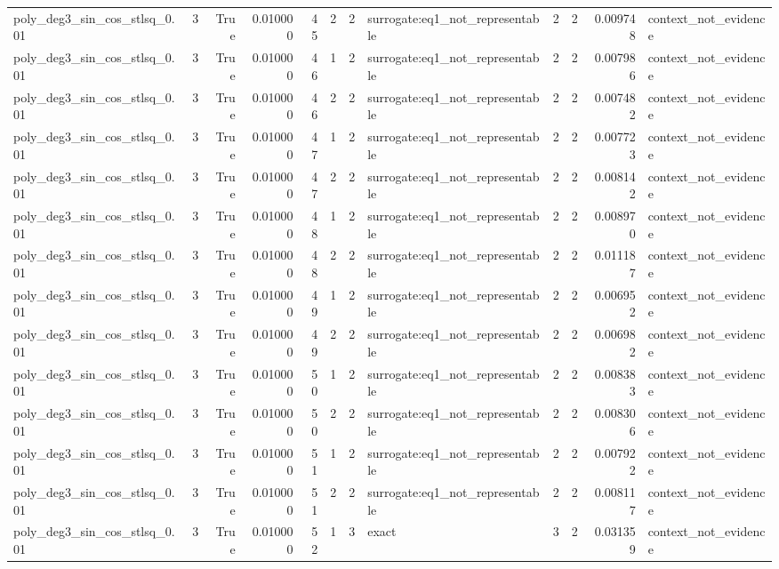 \begin{tabular}{lrrrrrrlrrrl}
poly\_deg3\_sin\_cos\_stlsq\_0.01 & 3 & True & 0.010000 & 45 & 2 & 2 & surrogate:eq1\_not\_representable & 2 & 2 & 0.009748 & context\_not\_evidence \\
poly\_deg3\_sin\_cos\_stlsq\_0.01 & 3 & True & 0.010000 & 46 & 1 & 2 & surrogate:eq1\_not\_representable & 2 & 2 & 0.007986 & context\_not\_evidence \\
poly\_deg3\_sin\_cos\_stlsq\_0.01 & 3 & True & 0.010000 & 46 & 2 & 2 & surrogate:eq1\_not\_representable & 2 & 2 & 0.007482 & context\_not\_evidence \\
poly\_deg3\_sin\_cos\_stlsq\_0.01 & 3 & True & 0.010000 & 47 & 1 & 2 & surrogate:eq1\_not\_representable & 2 & 2 & 0.007723 & context\_not\_evidence \\
poly\_deg3\_sin\_cos\_stlsq\_0.01 & 3 & True & 0.010000 & 47 & 2 & 2 & surrogate:eq1\_not\_representable & 2 & 2 & 0.008142 & context\_not\_evidence \\
poly\_deg3\_sin\_cos\_stlsq\_0.01 & 3 & True & 0.010000 & 48 & 1 & 2 & surrogate:eq1\_not\_representable & 2 & 2 & 0.008970 & context\_not\_evidence \\
poly\_deg3\_sin\_cos\_stlsq\_0.01 & 3 & True & 0.010000 & 48 & 2 & 2 & surrogate:eq1\_not\_representable & 2 & 2 & 0.011187 & context\_not\_evidence \\
poly\_deg3\_sin\_cos\_stlsq\_0.01 & 3 & True & 0.010000 & 49 & 1 & 2 & surrogate:eq1\_not\_representable & 2 & 2 & 0.006952 & context\_not\_evidence \\
poly\_deg3\_sin\_cos\_stlsq\_0.01 & 3 & True & 0.010000 & 49 & 2 & 2 & surrogate:eq1\_not\_representable & 2 & 2 & 0.006982 & context\_not\_evidence \\
poly\_deg3\_sin\_cos\_stlsq\_0.01 & 3 & True & 0.010000 & 50 & 1 & 2 & surrogate:eq1\_not\_representable & 2 & 2 & 0.008383 & context\_not\_evidence \\
poly\_deg3\_sin\_cos\_stlsq\_0.01 & 3 & True & 0.010000 & 50 & 2 & 2 & surrogate:eq1\_not\_representable & 2 & 2 & 0.008306 & context\_not\_evidence \\
poly\_deg3\_sin\_cos\_stlsq\_0.01 & 3 & True & 0.010000 & 51 & 1 & 2 & surrogate:eq1\_not\_representable & 2 & 2 & 0.007922 & context\_not\_evidence \\
poly\_deg3\_sin\_cos\_stlsq\_0.01 & 3 & True & 0.010000 & 51 & 2 & 2 & surrogate:eq1\_not\_representable & 2 & 2 & 0.008117 & context\_not\_evidence \\
poly\_deg3\_sin\_cos\_stlsq\_0.01 & 3 & True & 0.010000 & 52 & 1 & 3 & exact & 3 & 2 & 0.031359 & context\_not\_evidence \\

\end{tabular}
